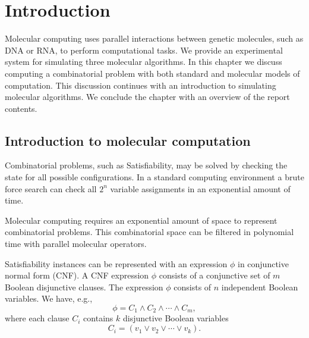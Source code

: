 \chapter{Introduction}


Molecular computing uses parallel interactions between genetic molecules, such as DNA or RNA, to perform computational tasks.  We provide an experimental system for simulating three molecular algorithms.  In this chapter we discuss computing a combinatorial problem with both standard and molecular models of computation.  This discussion continues with an introduction to simulating molecular algorithms.  We conclude the chapter with an overview of the report contents.

\section{Introduction to molecular computation}
	
				
Combinatorial problems, such as {\sc Satisfiability}, may be solved by checking the state for all possible configurations.  In a standard computing environment a brute force search can check all $2^n$ variable assignments in an exponential amount of time.

Molecular computing requires an exponential amount of space to represent combinatorial problems.  This combinatorial space can be filtered in polynomial time with parallel molecular operators.

{\sc Satisfiability} instances can be represented with an expression $\phi$ in conjunctive normal form (CNF).  A CNF expression $\phi$ consists of a conjunctive set of $m$ Boolean disjunctive clauses.  The expression $\phi$ consists of $n$ independent Boolean variables.  We have, e.g.,
\[
\phi = C_1 \wedge C_2 \wedge \cdots \wedge C_m, 
\]
where each clause $C_i$ contains $k$ disjunctive Boolean variables
\[
C_i = (v_1 \vee v_2 \vee \cdots \vee v_k).
\]

